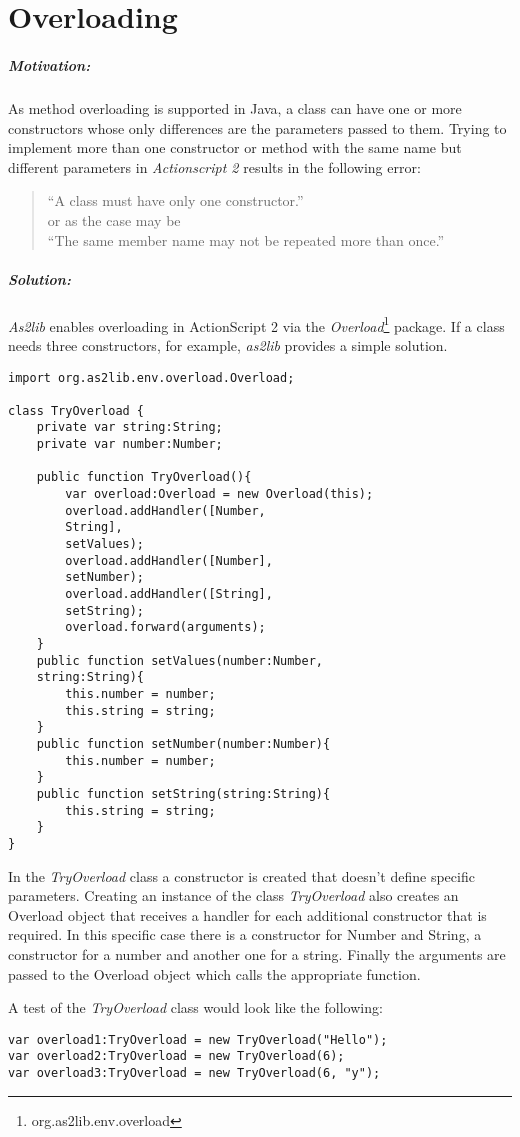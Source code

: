 \chapter{Overloading}
\label{sec:Overloading}

\paragraph{Motivation:}

As method overloading is supported in Java, a class can have one or more constructors whose only differences are the parameters passed to them. Trying to implement more than one constructor or method with the same name but different parameters in \emph{Actionscript 2} results in the following error:
\begin{quote}
	``A class must have only one constructor.''\\
	or as the case may be \\
	``The same member name may not be repeated more than once.''
\end{quote}

\paragraph{Solution:}

{\sl As2lib} enables overloading in ActionScript 2 via the \emph{Overload}\footnote{org.as2lib.env.overload} package. If a class needs three constructors, for example, {\sl as2lib} provides a simple solution.

\begin{lstlisting}[frame=single]
import org.as2lib.env.overload.Overload;

class TryOverload {
	private var string:String;
	private var number:Number;
	
	public function TryOverload(){
		var overload:Overload = new Overload(this);
		overload.addHandler([Number, 
		String], 
		setValues);
		overload.addHandler([Number], 
		setNumber);
		overload.addHandler([String],
		setString);
		overload.forward(arguments);
	}
	public function setValues(number:Number, 
	string:String){
		this.number = number;
		this.string = string;
	}
	public function setNumber(number:Number){
		this.number = number;
	}
	public function setString(string:String){
		this.string = string;
	}
}
\end{lstlisting}

In the \emph{TryOverload} class a constructor is created that doesn't define specific parameters. Creating an instance of the class \emph{TryOverload} also creates an Overload object that receives a handler for each additional constructor that is required. In this specific case there is a constructor for Number and String, a constructor for a number and another one for a string. Finally the arguments are passed to the Overload object which calls the appropriate function.

A test of the \emph{TryOverload} class would look like the following:

\begin{lstlisting}[frame=single]
var overload1:TryOverload = new TryOverload("Hello");
var overload2:TryOverload = new TryOverload(6);
var overload3:TryOverload = new TryOverload(6, "y");
\end{lstlisting}
